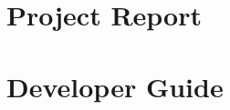 \documentclass[a4paper,twoside]{alpenthesis/alpenthesis}
\begin{document}
\part{Project Report}
\label{part:project_report}










%
%
\part{Developer Guide}
\label{part:Developer_Guide}

%
%
\end{document}
